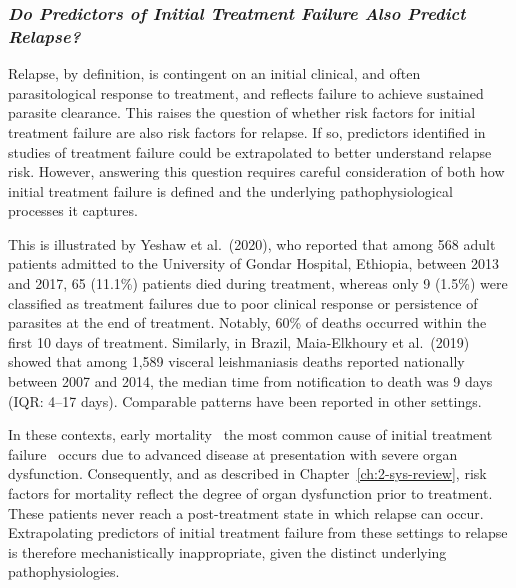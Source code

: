 \subsubsection{\textit{Do Predictors of Initial Treatment Failure Also Predict Relapse?}}

Relapse, by definition, is contingent on an initial clinical, and often parasitological response to treatment, and reflects failure to achieve sustained parasite clearance. This raises the question of whether risk factors for initial treatment failure are also risk factors for relapse. If so, predictors identified in studies of treatment failure could be extrapolated to better understand relapse risk. However, answering this question requires careful consideration of both how initial treatment failure is defined and the underlying pathophysiological processes it captures.

 This is illustrated by Yeshaw et al.\ (2020)\cite{yeshawIncidenceMortalityIts2020}, who reported that among 568 adult patients admitted to the University of Gondar Hospital, Ethiopia, between 2013 and 2017, 65 (11.1\%) patients died during treatment, whereas only 9 (1.5\%) were classified as treatment failures due to poor clinical response or persistence of parasites at the end of treatment. Notably, 60\% of deaths occurred within the first 10 days of treatment. Similarly, in Brazil, Maia-Elkhoury et al.\ (2019)\cite{maia-elkhoury2019} showed that among 1,589 visceral leishmaniasis deaths reported nationally between 2007 and 2014, the median time from notification to death was 9 days (IQR: 4--17 days). Comparable patterns have been reported in other settings\cite{kaminkClinicalSeverityScoring2017,werneckPrognosticFactorsDeath2003,alemu2023}.

In these contexts, early mortality \textemdash\ the most common cause of initial treatment failure \textemdash\ occurs due to advanced disease at presentation with severe organ dysfunction. Consequently, and as described in Chapter~\ref{ch:2-sys-review}, risk factors for mortality reflect the degree of organ dysfunction prior to treatment. These patients never reach a post-treatment state in which relapse can occur. Extrapolating predictors of initial treatment failure from these settings to relapse is therefore mechanistically inappropriate, given the distinct underlying pathophysiologies.

